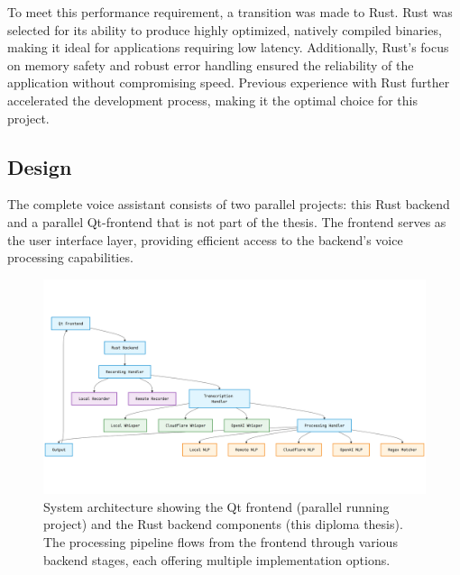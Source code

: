 To meet this performance requirement, a transition was made to Rust.
Rust was selected for its ability to produce highly optimized,
natively compiled binaries, making it ideal for applications requiring low latency.
Additionally, Rust's focus on memory safety and robust error handling
ensured the reliability of the application without compromising speed.
Previous experience with Rust further accelerated the development process,
making it the optimal choice for this project.

\subsection{Design}
The complete voice assistant consists of two parallel projects:
this Rust backend and a parallel Qt-frontend that is not part of the thesis.
The frontend serves as the user interface layer,
providing efficient access to the backend's voice processing capabilities.

\begin{figure}[H]
    \centering
    \includegraphics[width=\textwidth]{assets/stackchart}
    \caption{System architecture showing the Qt frontend (parallel running project) and the Rust backend components (this diploma thesis). The processing pipeline flows from the frontend through various backend stages, each offering multiple implementation options.}
    \label{fig:system-architecture}
\end{figure}